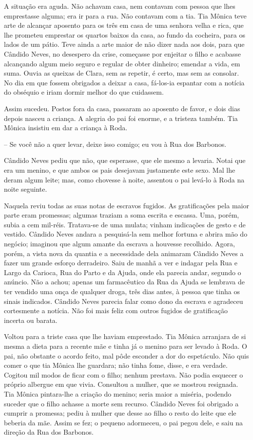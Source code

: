 A situação era aguda. Não achavam casa, nem contavam com pessoa que lhes
emprestasse alguma; era ir para a rua. Não contavam com a tia. Tia
Mônica teve arte de alcançar aposento para os três em casa de uma
senhora velha e rica, que lhe prometeu emprestar os quartos baixos da
casa, ao fundo da cocheira, para os lados de um pátio. Teve ainda a arte
maior de não dizer nada aos dois, para que Cândido Neves, no desespero
da crise, começasse por enjeitar o filho e acabasse alcançando algum
meio seguro e regular de obter dinheiro; emendar a vida, em suma. Ouvia
as queixas de Clara, sem as repetir, é certo, mas sem as consolar. No
dia em que fossem obrigados a deixar a casa, fá-los-ia espantar com a
notícia do obséquio e iriam dormir melhor do que cuidassem.

Assim sucedeu. Postos fora da casa, passaram ao aposento de favor, e
dois dias depois nasceu a criança. A alegria do pai foi enorme, e a
tristeza também. Tia Mônica insistiu em dar a criança à Roda.

-- Se você não a quer levar, deixe isso comigo; eu vou à Rua dos
Barbonos.

Cândido Neves pediu que não, que esperasse, que ele mesmo a levaria.
Notai que era um menino, e que ambos os pais desejavam justamente este
sexo. Mal lhe deram algum leite; mas, como chovesse à noite, assentou o
pai levá-lo à Roda na noite seguinte.

Naquela reviu todas as suas notas de escravos fugidos. As gratificações
pela maior parte eram promessas; algumas traziam a soma escrita e
escassa. Uma, porém, subia a cem mil-réis. Tratava-se de uma mulata;
vinham indicações de gesto e de vestido. Cândido Neves andara a
pesquisá-la sem melhor fortuna e abrira mão do negócio; imaginou que
algum amante da escrava a houvesse recolhido. Agora, porém, a vista nova
da quantia e a necessidade dela animaram Cândido Neves a fazer um grande
esforço derradeiro. Saiu de manhã a ver e indagar pela Rua e Largo da
Carioca, Rua do Parto e da Ajuda, onde ela parecia andar, segundo o
anúncio. Não a achou; apenas um farmacêutico da Rua da Ajuda se lembrava
de ter vendido uma onça de qualquer droga, três dias antes, à pessoa que
tinha os sinais indicados. Cândido Neves parecia falar como dono da
escrava e agradeceu cortesmente a notícia. Não foi mais feliz com outros
fugidos de gratificação incerta ou barata.

Voltou para a triste casa que lhe haviam emprestado. Tia Mônica
arranjara de si mesma a dieta para a recente mãe e tinha já o menino
para ser levado à Roda. O pai, não obstante o acordo feito, mal pôde
esconder a dor do espetáculo. Não quis comer o que tia Mônica lhe
guardara; não tinha fome, disse, e era verdade. Cogitou mil modos de
ficar com o filho; nenhum prestava. Não podia esquecer o próprio
albergue em que vivia. Consultou a mulher, que se mostrou resignada. Tia
Mônica pintara-lhe a criação do menino; seria maior a miséria, podendo
suceder que o filho achasse a morte sem recurso. Cândido Neves foi
obrigado a cumprir a promessa; pediu à mulher que desse ao filho o resto
do leite que ele beberia da mãe. Assim se fez; o pequeno adormeceu, o
pai pegou dele, e saiu na direção da Rua dos Barbonos.

